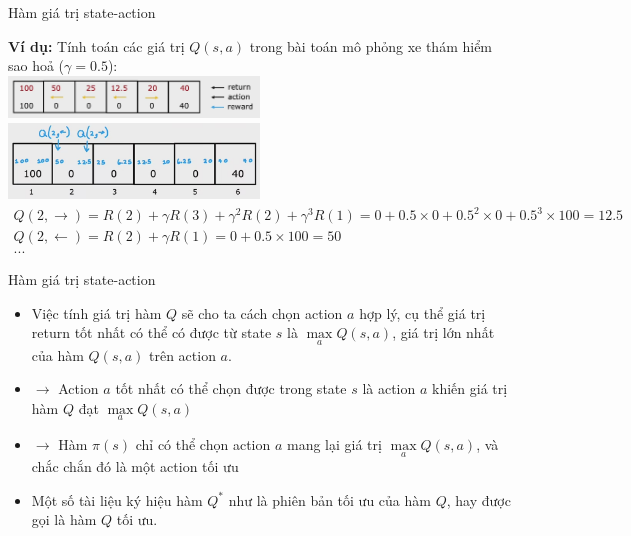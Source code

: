 \documentclass[10pt,aspectratio=169]{beamer}
\begin{document}
\begin{frame}{Hàm giá trị state-action}
\begin{center}
\textbf{Ví dụ:} Tính toán các giá trị $ Q(s,a) $ trong bài toán mô phỏng xe thám hiểm sao hoả ($ \gamma = 0.5 $): \\
\vspace{12pt}
\includegraphics[width=0.5\textwidth]{source/8.png}
\includegraphics[width=0.5\textwidth]{source/9.png}
\begin{gather*}
Q(2,\rightarrow) = R(2) + \gamma R(3) + \gamma^2 R(2) + \gamma^3 R(1) = 0 + 0.5\times0 + 0.5^2\times0 + 0.5^3\times100 = 12.5 \\[4pt]
Q(2,\leftarrow) = R(2) + \gamma R(1) = 0 + 0.5\times100 = 50 \\[4pt]
...
\end{gather*}
\end{center}
\end{frame}

\begin{frame}{Hàm giá trị state-action}
\begin{itemize}
\setlength\itemsep{8pt}
\item Việc tính giá trị hàm $ Q $ sẽ cho ta cách chọn action $ a $ hợp lý, cụ thể giá trị return tốt nhất có thể có được từ state $ s $ là \textcolor{mainblue}{$ \max\limits_{a} Q(s,a) $}, giá trị lớn nhất của hàm $ Q(s,a) $ trên action $ a $.
\item[] $ \rightarrow $ Action $ a $ tốt nhất có thể chọn được trong state $ s $ là action $ a $ khiến giá trị hàm $ Q $ đạt \textcolor{mainblue}{$ \max\limits_{a} Q(s,a) $}
\item [] $ \rightarrow $ Hàm $ \pi(s) $ chỉ có thể chọn action $ a $ mang lại giá trị \textcolor{mainblue}{$ \max\limits_{a} Q(s,a) $}, và chắc chắn đó là một action tối ưu
\item Một số tài liệu ký hiệu hàm $ Q^* $ như là phiên bản tối ưu của hàm $ Q $, hay được gọi là hàm $ Q $ tối ưu.
\end{itemize}
\end{frame}
\end{document}
